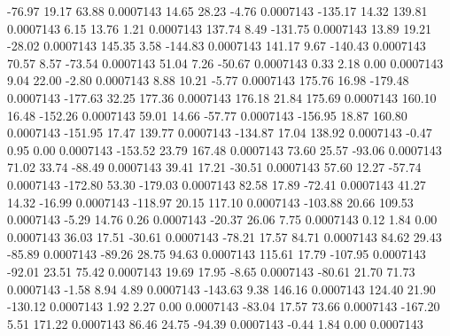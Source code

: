       -76.97       19.17       63.88     0.0007143
       14.65       28.23       -4.76     0.0007143
     -135.17       14.32      139.81     0.0007143
        6.15       13.76        1.21     0.0007143
      137.74        8.49     -131.75     0.0007143
       13.89       19.21      -28.02     0.0007143
      145.35        3.58     -144.83     0.0007143
      141.17        9.67     -140.43     0.0007143
       70.57        8.57      -73.54     0.0007143
       51.04        7.26      -50.67     0.0007143
        0.33        2.18        0.00     0.0007143
        9.04       22.00       -2.80     0.0007143
        8.88       10.21       -5.77     0.0007143
      175.76       16.98     -179.48     0.0007143
     -177.63       32.25      177.36     0.0007143
      176.18       21.84      175.69     0.0007143
      160.10       16.48     -152.26     0.0007143
       59.01       14.66      -57.77     0.0007143
     -156.95       18.87      160.80     0.0007143
     -151.95       17.47      139.77     0.0007143
     -134.87       17.04      138.92     0.0007143
       -0.47        0.95        0.00     0.0007143
     -153.52       23.79      167.48     0.0007143
       73.60       25.57      -93.06     0.0007143
       71.02       33.74      -88.49     0.0007143
       39.41       17.21      -30.51     0.0007143
       57.60       12.27      -57.74     0.0007143
     -172.80       53.30     -179.03     0.0007143
       82.58       17.89      -72.41     0.0007143
       41.27       14.32      -16.99     0.0007143
     -118.97       20.15      117.10     0.0007143
     -103.88       20.66      109.53     0.0007143
       -5.29       14.76        0.26     0.0007143
      -20.37       26.06        7.75     0.0007143
        0.12        1.84        0.00     0.0007143
       36.03       17.51      -30.61     0.0007143
      -78.21       17.57       84.71     0.0007143
       84.62       29.43      -85.89     0.0007143
      -89.26       28.75       94.63     0.0007143
      115.61       17.79     -107.95     0.0007143
      -92.01       23.51       75.42     0.0007143
       19.69       17.95       -8.65     0.0007143
      -80.61       21.70       71.73     0.0007143
       -1.58        8.94        4.89     0.0007143
     -143.63        9.38      146.16     0.0007143
      124.40       21.90     -130.12     0.0007143
        1.92        2.27        0.00     0.0007143
      -83.04       17.57       73.66     0.0007143
     -167.20        5.51      171.22     0.0007143
       86.46       24.75      -94.39     0.0007143
       -0.44        1.84        0.00     0.0007143
